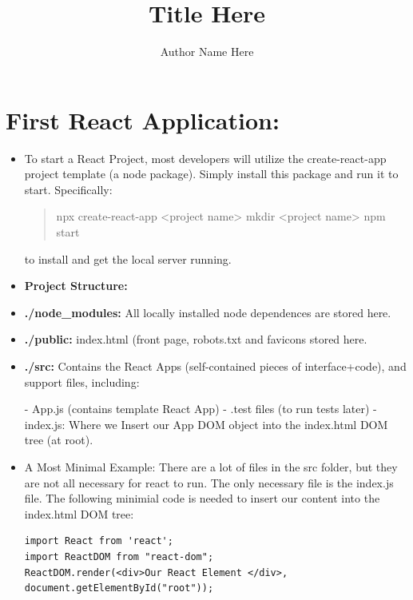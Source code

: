 \documentclass[8pt,a4paper]{extarticle}
\title{Title Here}
\author{Author Name Here}
\begin{document}
\newcommand{\mitem}{\item[$\square$]}
\newcommand{\mmitem}{\item[$\triangledown$]}

\maketitle


\section*{First React Application:}

\begin{itemize}
\item To start a React Project, most developers will utilize the create-react-app project template (a node package). Simply install this package and run it to start.
Specifically:

\begin{verse}

npx create-react-app <project name>
mkdir <project name>
npm start

\end{verse}

to install and get the local server running.

\item \textbf{Project Structure:}
\item \textbf{./node_modules:} All locally installed node dependences are stored here.
\item \textbf{./public:} index.html (front page, robots.txt and favicons stored here.
\item \textbf{./src:} Contains the React Apps (self-contained pieces of interface+code), and support files, including:

- App.js (contains template React App)
- .test files (to run tests later)
- index.js: Where we Insert our App DOM object into the index.html DOM tree (at root).

\item A Most Minimal Example: There are a lot of files in the src folder, but they are not all necessary for react to run. The only necessary file is the index.js file. The following minimial code is needed to insert our content into the index.html DOM tree:

\begin{verbatim}
import React from 'react';
import ReactDOM from "react-dom";
ReactDOM.render(<div>Our React Element </div>, 
document.getElementById("root"));
\end{verbatim}


\end{itemize}
\end{document}
